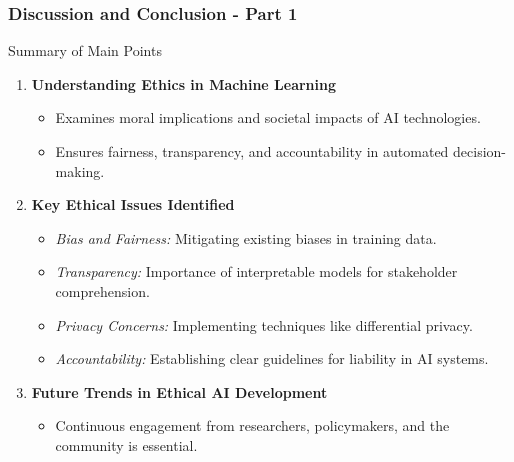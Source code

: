 \documentclass[aspectratio=169]{beamer}
\begin{document}
\begin{frame}[fragile]
    \frametitle{Discussion and Conclusion - Part 1}
    
    \begin{block}{Summary of Main Points}
        \begin{enumerate}
            \item \textbf{Understanding Ethics in Machine Learning}
                  \begin{itemize}
                      \item Examines moral implications and societal impacts of AI technologies.
                      \item Ensures fairness, transparency, and accountability in automated decision-making.
                  \end{itemize}
            
            \item \textbf{Key Ethical Issues Identified}
                  \begin{itemize}
                      \item \textit{Bias and Fairness:} Mitigating existing biases in training data.
                      \item \textit{Transparency:} Importance of interpretable models for stakeholder comprehension.
                      \item \textit{Privacy Concerns:} Implementing techniques like differential privacy.
                      \item \textit{Accountability:} Establishing clear guidelines for liability in AI systems.
                  \end{itemize}
            
            \item \textbf{Future Trends in Ethical AI Development}
                  \begin{itemize}
                      \item Continuous engagement from researchers, policymakers, and the community is essential.
                  \end{itemize}
        \end{enumerate}
    \end{block}
\end{frame}
\end{document}
